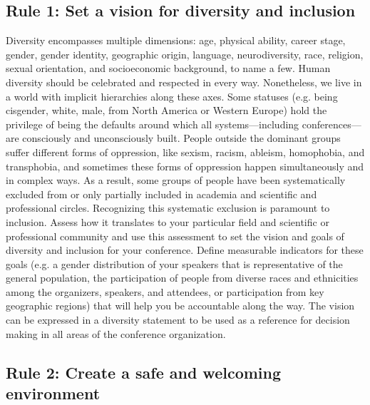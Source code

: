 \documentclass[10pt,letterpaper]{article}
\begin{document}
\subsection*{Rule 1: Set a vision for diversity and inclusion}
\label{rule_diversity}

Diversity encompasses multiple dimensions: age, physical ability, career stage, gender, gender identity, geographic origin, language, neurodiversity, race, religion, sexual orientation, and socioeconomic background, to name a few.
Human diversity should be celebrated and respected in every way. 
Nonetheless, we live in a world with implicit hierarchies along these axes. 
Some statuses (e.g. being cisgender, white, male, from North America or Western Europe) hold the privilege of being the defaults around which all systems—including conferences—are consciously and unconsciously built. 
People outside the dominant groups suffer different forms of oppression, like sexism, racism, ableism, homophobia, and transphobia, and sometimes these forms of oppression happen simultaneously and in complex ways.
As a result, some groups of people have been systematically excluded from or only partially included in academia and scientific and professional circles.
Recognizing this systematic exclusion is paramount to inclusion.
Assess how it translates to your particular field and scientific or professional community and use this assessment to set the vision and goals of diversity and inclusion for your conference.
Define measurable indicators for these goals (e.g. a gender distribution of your speakers that is representative of the general population, the participation of people from diverse races and ethnicities among the organizers, speakers, and attendees, or participation from key geographic regions) that will help you be accountable along the way.
The vision can be expressed in a diversity statement to be used as a reference for decision making in all areas of the conference organization. 

\subsection*{Rule 2: Create a safe and welcoming environment}
\label{rule_inclusion}
\end{document}
